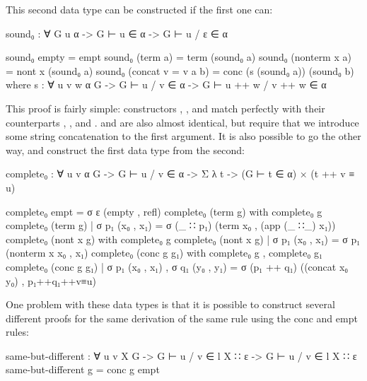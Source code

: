	This second data type can be constructed if the first one can:

	\begin{code}
		sound₀ :  ∀ {G u α} -> G ⊢ u ∈ α -> G ⊢ u / ε ∈ α

		sound₀ empty = empt
		sound₀ (term a) = term (sound₀ a)
		sound₀ (nonterm x a) = nont x (sound₀ a)
		sound₀ (concat {v = v} a b) = conc (s (sound₀ a)) (sound₀ b)
		  where
		    s : ∀ {u v w α G} ->
		      G ⊢ u / v ∈ α ->
		      G ⊢ u ++ w / v ++ w ∈ α
	\end{code}

	This proof is fairly simple: constructors , ,
	and  match perfectly with their counterparts ,
	, and .  and  are
	also almost identical, but require that we introduce some string
	concatenation to the first argument. It is also possible to go the other
	way, and construct the first data type from the second:

	\begin{code}
		complete₀ : ∀ {u v α G} -> G ⊢ u / v ∈ α ->
		  Σ λ t -> (G ⊢ t ∈ α) × (t ++ v ≡ u)

		complete₀ empt = σ ε (empty , refl)
		complete₀ (term g) with complete₀ g
		complete₀ (term g) | σ p₁ (x₀ , x₁) = σ (_ ∷ p₁) (term x₀ , (app (_ ∷_) x₁))
		complete₀ (nont x g) with complete₀ g
		complete₀ (nont x g) | σ p₁ (x₀ , x₁) = σ p₁ (nonterm x x₀ , x₁)
		complete₀ (conc g g₁) with complete₀ g , complete₀ g₁
		complete₀ (conc g g₁) | σ p₁ (x₀ , x₁) , σ q₁ (y₀ , y₁) =
		  σ (p₁ ++ q₁) ((concat x₀ y₀) , p₁++q₁++v≡u)
	\end{code}

	One problem with these data types is that it is possible to construct
	several different proofs for the same derivation of the same rule using the
	conc and empt rules:

	\begin{code}
		same-but-different : ∀ {u v X G} ->
		  G ⊢ u / v ∈ l X ∷ ε ->
		  G ⊢ u / v ∈ l X ∷ ε
		same-but-different g = conc g empt
	\end{code}

